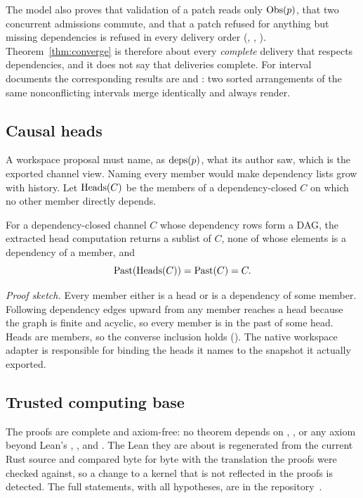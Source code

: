 The model also proves that validation of a patch reads only $\operatorname{Obs}(p)$, that two concurrent admissions commute, and that a patch refused for anything but missing dependencies is refused in every delivery order (, , ). Theorem~\ref{thm:converge} is therefore about every \emph{complete} delivery that respects dependencies, and it does not say that deliveries complete. For interval documents the corresponding results are  and : two sorted arrangements of the same nonconflicting intervals merge identically and always render.

\subsection{Causal heads}\label{sec:heads}
A workspace proposal must name, as $\operatorname{deps}(p)$, what its author saw, which is the exported channel view. Naming every member would make dependency lists grow with history. Let $\operatorname{Heads}(C)$ be the members of a dependency-closed $C$ on which no other member directly depends.
\begin{claim}\label{thm:heads}
For a dependency-closed channel $C$ whose dependency rows form a DAG, the extracted head computation returns a sublist of $C$, none of whose elements is a dependency of a member, and
\begin{equation}
 \operatorname{Past}(\operatorname{Heads}(C))=\operatorname{Past}(C)=C.
 \label{eq:heads}
\end{equation}
\end{claim}
\noindent\emph{Proof sketch.} Every member either is a head or is a dependency of some member. Following dependency edges upward from any member reaches a head because the graph is finite and acyclic, so every member is in the past of some head. Heads are members, so the converse inclusion holds (). The native workspace adapter is responsible for binding the heads it names to the snapshot it actually exported.

\subsection{Trusted computing base}\label{sec:gate}
The proofs are complete and axiom-free: no theorem depends on , , or any axiom beyond Lean's , , and . The Lean they are about is regenerated from the current Rust source and compared byte for byte with the translation the proofs were checked against, so a change to a kernel that is not reflected in the proofs is detected. The full statements, with all hypotheses, are in the repository~\cite{o5s}.

